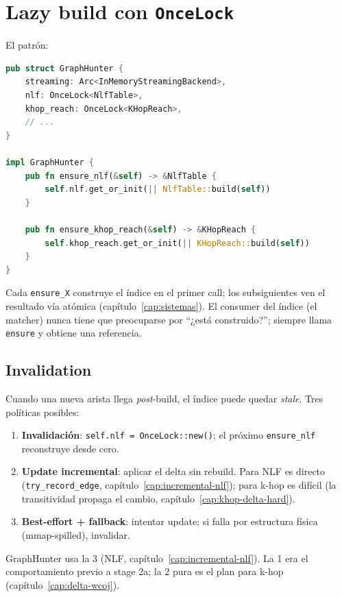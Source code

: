 \section{Lazy build con \texttt{OnceLock}}

El patrón:

\begin{lstlisting}[language=Rust]
pub struct GraphHunter {
    streaming: Arc<InMemoryStreamingBackend>,
    nlf: OnceLock<NlfTable>,
    khop_reach: OnceLock<KHopReach>,
    // ...
}

impl GraphHunter {
    pub fn ensure_nlf(&self) -> &NlfTable {
        self.nlf.get_or_init(|| NlfTable::build(self))
    }

    pub fn ensure_khop_reach(&self) -> &KHopReach {
        self.khop_reach.get_or_init(|| KHopReach::build(self))
    }
}
\end{lstlisting}

\noindent
Cada \texttt{ensure\_X} construye el índice en el primer call;
los subsiguientes ven el resultado vía atómica
(capítulo~\ref{cap:sistemas}). El consumer del índice (el matcher)
nunca tiene que preocuparse por ``¿está construido?''; siempre
llama \texttt{ensure} y obtiene una referencia.

\subsection{Invalidation}

Cuando una nueva arista llega \emph{post}-build, el índice puede
quedar \emph{stale}. Tres políticas posibles:

\begin{enumerate}
    \item \textbf{Invalidación}: \texttt{self.nlf = OnceLock::new()};
    el próximo \texttt{ensure\_nlf} reconstruye desde cero.
    \item \textbf{Update incremental}: aplicar el delta sin
    rebuild. Para NLF es directo (\texttt{try\_record\_edge},
    capítulo~\ref{cap:incremental-nlf}); para k-hop es difícil
    (la transitividad propaga el cambio, capítulo~\ref{cap:khop-delta-hard}).
    \item \textbf{Best-effort + fallback}: intentar update; si
    falla por estructura física (mmap-spilled), invalidar.
\end{enumerate}

\noindent
GraphHunter usa la 3 (NLF, capítulo~\ref{cap:incremental-nlf}). La
1 era el comportamiento previo a stage 2a; la 2 pura es el plan
para k-hop (capítulo~\ref{cap:delta-wcoj}).

